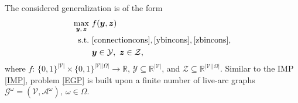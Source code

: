 \documentclass[a4paper,10pt]{article}
\newcommand{\G}{\mathcal{G}}
\newcommand{\V}{\mathcal{V}}
\newcommand{\A}{\mathcal{A}}
\theoremstyle{plain}
\begin{document}
	The considered generalization is of the form 
	\begin{equation}\label{EGP}
		\begin{aligned}
			\max_{\boldsymbol{y},\,\boldsymbol{z}}\ &f(\boldsymbol{y},\boldsymbol{z}) \\
			\hbox{s.t.}\ &\eqref{connectioncons},\eqref{ybincons},\eqref{zbincons},\\
			& \boldsymbol{y}\in\mathcal{Y},~ \boldsymbol{z}\in\mathcal{Z},
		\end{aligned}
	\end{equation}
	where $f$: $\{0,1\}^{|\V|}\times \{0,1\}^{|\V||\Omega|} \rightarrow \mathbb{R}$, $\mathcal{Y} \subseteq \mathbb{R}^{|\V|}$, and $\mathcal{Z} \subseteq \mathbb{R}^{|\V||\Omega|}$.
	Similar to the IMP \eqref{IMP}, problem \eqref{EGP} is built upon a finite number of live-arc graphs $\G^{\omega}=(\V,\A^{\omega}),~\omega\in\Omega$. 
\end{document}
